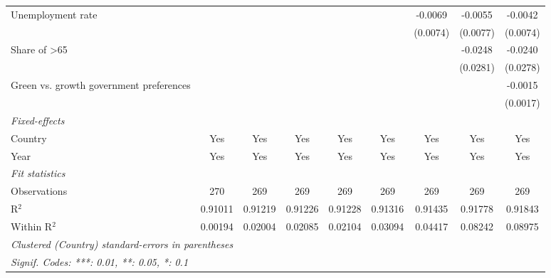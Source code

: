 \begin{table}[htbp]
\begin{tabular}{lcccccccc}
      Unemployment rate                                             &          &          &          &          &          & -0.0069  & -0.0055  & -0.0042\\   
                                                                    &          &          &          &          &          & (0.0074) & (0.0077) & (0.0074)\\   
      Share of >65                                                  &          &          &          &          &          &          & -0.0248  & -0.0240\\   
                                                                    &          &          &          &          &          &          & (0.0281) & (0.0278)\\   
      Green vs. growth government preferences                       &          &          &          &          &          &          &          & -0.0015\\   
                                                                    &          &          &          &          &          &          &          & (0.0017)\\   
      \midrule
      \emph{Fixed-effects}\\
      Country                                                       & Yes      & Yes      & Yes      & Yes      & Yes      & Yes      & Yes      & Yes\\  
      Year                                                          & Yes      & Yes      & Yes      & Yes      & Yes      & Yes      & Yes      & Yes\\  
      \midrule
      \emph{Fit statistics}\\
      Observations                                                  & 270      & 269      & 269      & 269      & 269      & 269      & 269      & 269\\  
      R$^2$                                                         & 0.91011  & 0.91219  & 0.91226  & 0.91228  & 0.91316  & 0.91435  & 0.91778  & 0.91843\\  
      Within R$^2$                                                  & 0.00194  & 0.02004  & 0.02085  & 0.02104  & 0.03094  & 0.04417  & 0.08242  & 0.08975\\  
      \midrule \midrule
      \multicolumn{9}{l}{\emph{Clustered (Country) standard-errors in parentheses}}\\
      \multicolumn{9}{l}{\emph{Signif. Codes: ***: 0.01, **: 0.05, *: 0.1}}\\
   \end{tabular}
\end{table}


